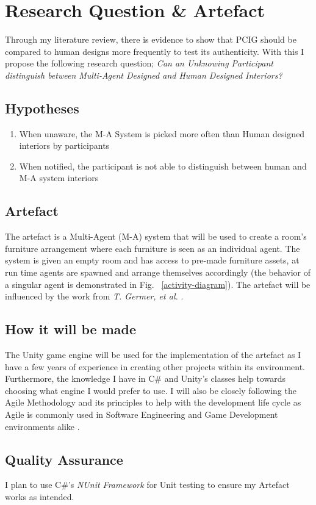 \section{Research Question \& Artefact}
Through my literature review, there is evidence to show that PCIG should be compared to human designs more frequently to test its authenticity. With this I propose the following research question; \textit{Can an Unknowing Participant distinguish between Multi-Agent Designed and Human Designed Interiors?}

\subsection{Hypotheses}
\begin{enumerate}
    \item When unaware, the M-A System is picked more often than Human designed interiors by participants
    \item When notified, the participant is not able to distinguish between human and M-A system interiors
\end{enumerate}

\subsection{Artefact}
The artefact is a Multi-Agent (M-A) system that will be used to create a room's furniture arrangement where each furniture is seen as an individual agent. The system is given an empty room and has access to pre-made furniture assets, at run time agents are spawned and arrange themselves accordingly (the behavior of a singular agent is demonstrated in Fig. ~\ref{activity-diagram}). The artefact will be influenced by the work from \textit{T. Germer, et al.} \cite{real-time-walkthroughs}.


\subsection{How it will be made} 
The Unity game engine\cite{unity} will be used for the implementation of the artefact as I have a few years of experience in creating other projects within its environment. Furthermore, the knowledge I have in C\# and Unity's classes help towards choosing what engine I would prefer to use.
I will also be closely following the Agile Methodology and its principles to help with the development life cycle as Agile is commonly used in Software Engineering and Game Development environments alike \cite{game-dev-agile}.

\subsection{Quality Assurance} 
I plan to use C\#'s \textit{NUnit Framework} \cite{nunit-framework} for Unit testing to ensure my Artefact works as intended.
